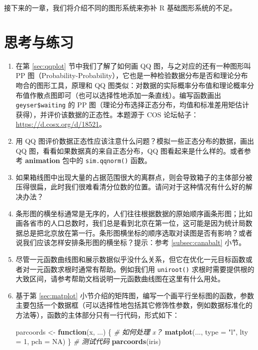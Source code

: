 \documentclass[
  b5paper,
  UTF8,twoside]{book}
\newenvironment{Shaded}{\begin{snugshade}}{\end{snugshade}}
\newcommand{\AttributeTok}[1]{\textcolor[rgb]{0.13,0.29,0.53}{#1}}
\newcommand{\CommentTok}[1]{\textcolor[rgb]{0.56,0.35,0.01}{\textit{#1}}}
\newcommand{\ConstantTok}[1]{\textcolor[rgb]{0.56,0.35,0.01}{#1}}
\newcommand{\ControlFlowTok}[1]{\textcolor[rgb]{0.13,0.29,0.53}{\textbf{#1}}}
\newcommand{\DecValTok}[1]{\textcolor[rgb]{0.00,0.00,0.81}{#1}}
\newcommand{\FunctionTok}[1]{\textcolor[rgb]{0.13,0.29,0.53}{\textbf{#1}}}
\newcommand{\NormalTok}[1]{#1}
\newcommand{\OtherTok}[1]{\textcolor[rgb]{0.56,0.35,0.01}{#1}}
\newcommand{\StringTok}[1]{\textcolor[rgb]{0.31,0.60,0.02}{#1}}
\begin{document}
接下来的一章，我们将介绍不同的图形系统来弥补 R 基础图形系统的不足。

\section{思考与练习}\label{ux601dux8003ux4e0eux7ec3ux4e60-3}

\begin{enumerate}
\def\labelenumi{\arabic{enumi}.}
\item
  在第 \ref{sec:qqplot} 节中我们了解了如何画 QQ 图，与之对应的还有一种图形叫 PP 图（Probability-Probability），它也是一种检验数据分布是否和理论分布吻合的图形工具，原理和 QQ 图类似：对数据的实际概率分布值和理论概率分布值作散点图即可（也可以选择性地添加一条直线）。编写函数画出 \texttt{geyser\$waiting} 的 PP 图（理论分布选择正态分布，均值和标准差用矩估计获得），并评价该数据的正态性。本题源于 COS 论坛帖子：\url{https://d.cosx.org/d/18521}。
\item
  用 QQ 图评价数据正态性应该注意什么问题？模拟一些正态分布的数据，画出 QQ 图，看看如果数据真的来自正态分布，QQ 图看起来是什么样的。或者参考 \textbf{animation} 包中的 \texttt{sim.qqnorm()} 函数。
\item
  如果箱线图中出现大量的占据范围很大的离群点，则会导致箱子的主体部分被压得很扁，此时我们很难看清分位数的位置。请问对于这种情况有什么好的解决办法？
\item
  条形图的横坐标通常是无序的，人们往往根据数据的原始顺序画条形图；比如画各省市的人口总数时，我们总是看到北京在第一位，这可能是因为统计局数据总是把北京放在第一行。条形图横坐标的顺序选取对读图是否有影响？或者说我们应该怎样安排条形图的横坐标？提示：参考 \ref{subsec:canabalt} 小节。
\item
  尽管一元函数曲线图和展示数据似乎没什么关系，但它在优化一元目标函数或者对一元函数求根时通常有帮助。例如我们用 \texttt{uniroot()} 求根时需要提供根的大致区间，请参考帮助文档说明一元函数曲线图在这里有什么用处。
\item
  基于第 \ref{sec:matplot} 小节介绍的矩阵图，编写一个画平行坐标图的函数，参数主要包括一个数据框（可以选择性地包括其它修饰性参数，例如数据标准化的方法等），函数的主体部分只有一行代码，形式如下：

\begin{Shaded}
\begin{Highlighting}[]
\NormalTok{parcoords }\OtherTok{\textless{}{-}} \ControlFlowTok{function}\NormalTok{(x, ...) \{}
  \CommentTok{\# 如何处理 x？}
  \FunctionTok{matplot}\NormalTok{(..., }\AttributeTok{type =} \StringTok{"l"}\NormalTok{, }\AttributeTok{lty =} \DecValTok{1}\NormalTok{, }\AttributeTok{pch =} \ConstantTok{NA}\NormalTok{)}
\NormalTok{\}}
\CommentTok{\# 测试代码}
\FunctionTok{parcoords}\NormalTok{(iris)}
\end{Highlighting}
\end{Shaded}


\end{enumerate}
\end{document}
